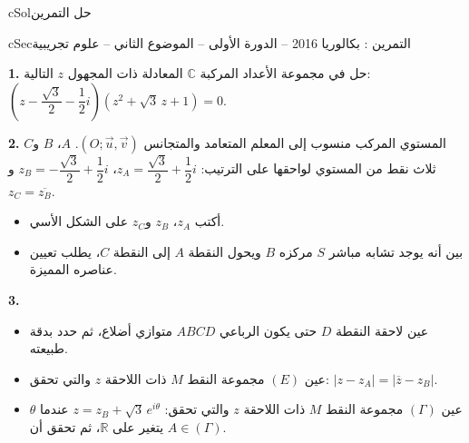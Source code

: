 \documentclass[12pt,a4paper]{article}
\newenvironment{BOX}[2]{\begin{otherlanguage}{english}\begin{arbox}{#1}{#2}}{\end{arbox}\end{otherlanguage}}
\newcounter{exo}
\newenvironment{tamrin}[1]{\stepcounter{exo}\begin{BOX}{cSec}{التمرين \theexo: #1}}{\end{BOX}}
\newenvironment{hal}{\Needspace{12\baselineskip}\begin{otherlanguage}{english}\begin{arbox}[breakable]{cSol}{حل التمرين \theexo}}{\end{arbox}\end{otherlanguage}}
\newenvironment{LTR}{\begin{otherlanguage}{english}}{\end{otherlanguage}}
\newenvironment{sq}{\begin{itemize}[leftmargin=2.4em,itemsep=3pt]}{\end{itemize}}
\newcommand{\qa}{\item[(أ)]}\newcommand{\qb}{\item[(ب)]}\newcommand{\qc}{\item[(جـ)]}\newcommand{\qd}{\item[(د)]}\newcommand{\qe}{\item[(هـ)]}
\newcommand{\QQ}[1]{\par\smallskip\textbf{#1.} }
\begin{document}
\begin{hal}
\begin{center}\begin{LTR}\end{LTR}\end{center}
\end{hal}

\begin{tamrin}{بكالوريا 2016 -- الدورة الأولى -- الموضوع الثاني -- علوم تجريبية}
\QQ{1} حل في مجموعة الأعداد المركبة $\mathbb{C}$ المعادلة ذات المجهول $z$ التالية: $\left(z-\dfrac{\sqrt3}{2}-\dfrac12i\right)\left(z^2+\sqrt3\,z+1\right)=0$.
\QQ{2} المستوي المركب منسوب إلى المعلم المتعامد والمتجانس $(O;\vec u,\vec v)$.
$A$، $B$ و$C$ ثلاث نقط من المستوي لواحقها على الترتيب: $z_A=\dfrac{\sqrt3}{2}+\dfrac12i$، $z_B=-\dfrac{\sqrt3}{2}+\dfrac12i$ و$z_C=\overline{z_B}$.
\begin{sq}
\qa أكتب $z_A$، $z_B$ و$z_C$ على الشكل الأسي.
\qb بين أنه يوجد تشابه مباشر $S$ مركزه $B$ ويحول النقطة $A$ إلى النقطة $C$، يطلب تعيين عناصره المميزة.
\end{sq}
\QQ{3}
\begin{sq}
\qa عين لاحقة النقطة $D$ حتى يكون الرباعي $ABCD$ متوازي أضلاع، ثم حدد بدقة طبيعته.
\qb عين $(E)$ مجموعة النقط $M$ ذات اللاحقة $z$ والتي تحقق: $|z-z_A|=\left|\overline{z}-z_B\right|$.
\qc عين $(\Gamma)$ مجموعة النقط $M$ ذات اللاحقة $z$ والتي تحقق: $z=z_B+\sqrt3\,e^{i\theta}$ عندما $\theta$ يتغير على $\mathbb{R}$، ثم تحقق أن $A\in(\Gamma)$.
\end{sq}
\end{tamrin}
\end{document}
